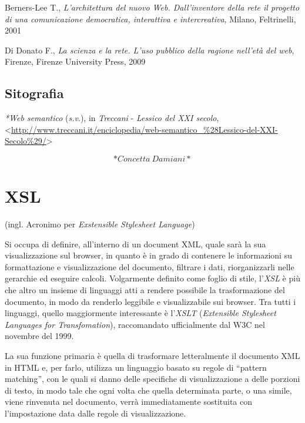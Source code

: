 \documentclass[
  b5paper,
  twoside,
  12pt,
  chapterprefix=false,
  bibliography=totocnumbered,
  parskip=false]{scrbook}
\begin{document}
Berners-Lee T., \emph{L'architettura del nuovo Web. Dall'inventore della
rete il progetto di una comunicazione democratica, interattiva e
intercreativa}, Milano, Feltrinelli, 2001

Di Donato F., \emph{La scienza e la rete. L'uso pubblico della ragione
nell'età del web}, Firenze, Firenze University Press, 2009

\hypertarget{sitografia-33}{%
\section*{Sitografia}\label{sitografia-33}}

\emph{*Web semantico} (\emph{s.v}.), in \emph{Treccani} - \emph{Lessico del XXI secolo},
\textless{}\href{http://www.treccani.it/enciclopedia/web-semantico_\%28Lessico-del-XXI-Secolo\%29/}{{http://www.treccani.it/enciclopedia/web-semantico\_\%28Lessico-del-XXI-Secolo\%29/}}\textgreater{}

\[*Concetta~Damiani*\]

\hypertarget{xsl}{%
\chapter{XSL}\label{xsl}}

(ingl. Acronimo per \emph{Exstensible Stylesheet Language})

Si occupa di definire, all'interno di un document XML, quale sarà la sua
visualizzazione sul browser, in quanto è in grado di contenere le
informazioni su formattazione e visualizzazione del documento, filtrare
i dati, riorganizzarli nelle gerarchie ed eseguire calcoli. Volgarmente
definito come foglio di stile, l'\emph{XSL} è più che altro un insieme di
linguaggi atti a rendere possibile la trasformazione del documento, in
modo da renderlo leggibile e visualizzabile sui browser. Tra tutti i
linguaggi, quello maggiormente interessante è l'\emph{XSLT} (\emph{Extensible
Stylesheet Languages for Transfomation}), raccomandato ufficialmente dal
W3C nel novembre del 1999.

La sua funzione primaria è quella di trasformare letteralmente il
documento XML in HTML e, per farlo, utilizza un linguaggio basato su
regole di \enquote{pattern matching}, con le quali si danno delle specifiche di
visualizzazione a delle porzioni di testo, in modo tale che ogni volta
che quella determinata parte, o una simile, viene rinvenuta nel
documento, verrà immediatamente sostituita con l'impostazione data dalle
regole di visualizzazione.
\end{document}
